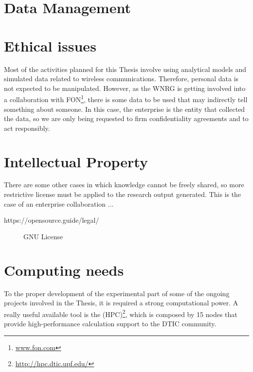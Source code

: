 \documentclass[12pt, a4paper,twoside]{article}
\begin{document}
	\section{Data Management}
	\label{section:data_mgm}	

	
	\section{Ethical issues}
	\label{section:ethical}		
	Most of the activities planned for this Thesis involve using analytical models and simulated data related to wireless communications. Therefore, personal data is not expected to be manipulated. However, as the WNRG is getting involved into a collaboration with FON\footnote{\url{www.fon.com}}, there is some data to be used that may indirectly tell something about someone. In this case, the enterprise is the entity that collected the data, so we are only being requested to firm confidentiality agreements and to act responsibly.
		
	\section{Intellectual Property}
	\label{section:intellectual}		
	There are some other cases in which knowledge cannot be freely shared, so more restrictive license must be applied to the research output generated. This is the case of an enterprise collaboration ...
	
	https://opensource.guide/legal/
	
	\begin{figure}[t!]
		\centering
		\caption{GNU License}
		\label{fig:gnu_license}
	\end{figure}
	
	\section{Computing needs}
	\label{section:computing}		
	To the proper development of the experimental part of some of the ongoing projects involved in the Thesis, it is required a strong computational power. A really useful available tool is the (HPC)\footnote{\url{http://hpc.dtic.upf.edu/}}, which is composed by 15 nodes that provide high-performance calculation support to the DTIC community. 
	
\end{document}
